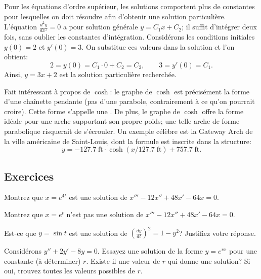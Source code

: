 \begin{example}
	Pour les équations d'ordre supérieur, les solutions comportent plus de constantes pour lesquelles
	on doit résoudre afin d'obtenir une solution particulière.
	L'équation  $\frac{d^2y}{dx^2} = 0$ a pour solution générale $y = C_1 x + C_2$;
	il suffit d'intégrer deux fois, sans oublier les constantes d'intégration.
	Considérons les conditions initiales $y(0) = 2$ et $y'(0) = 3$.
	On substitue ces valeurs dans la solution et l'on obtient:
	\begin{equation*}
		2 = y(0) = C_1 \cdot 0 + C_2 = C_2, \qquad
		3 = y'(0) = C_1 .
	\end{equation*}
	Ainsi, $y = 3x + 2$ est la solution particulière recherchée.
\end{example}

Fait intéressant à propos de $\cosh$:  le graphe de $\cosh$ est précisément la forme d'une
chaînette pendante (pas d'une parabole, contrairement à ce qu'on pourrait croire).
Cette forme s'appelle une \emph{}.
De plus, le graphe de $\cosh$ offre la forme idéale pour une arche supportant son propre poids;
une telle arche de forme parabolique risquerait de s'écrouler.
Un exemple célèbre est la  {Gateway Arch} de la ville
américaine de Saint-Louis, dont la formule est inscrite dans la structure:
\begin{equation*}
	y = -127.7 \; \textrm{ft} \cdot \cosh\left( x /127.7  \; \textrm{ft} \right) + 757.7 \;\textrm{ft} .
\end{equation*}


\subsection{Exercices}

\begin{exercise}
	Montrez que $x = e^{4t}$ est une solution de $x'''-12 x'' + 48 x' - 64 x = 0$.
\end{exercise}

\begin{exercise}
	Montrez que $x = e^{t}$ n'est pas une solution de $x'''-12 x'' + 48 x' - 64 x = 0$.
\end{exercise}

\begin{exercise}
	Est-ce que $y = \sin t$ est une solution de ${\left( \frac{dy}{dt} \right)}^2 = 1 - y^2$?
	Justifiez votre réponse.
\end{exercise}

\begin{exercise}
	Considérons $y'' + 2y' - 8y = 0$.
	Essayez une solution de la forme $y = e^{rx}$ pour une constante (à déterminer) $r$.
	Existe-il une valeur de $r$ qui donne une solution? Si oui, trouvez toutes les valeurs possibles de $r$.
\end{exercise}

